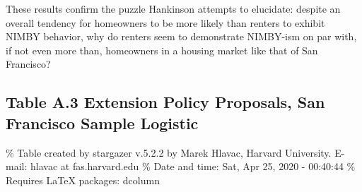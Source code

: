 \documentclass[]{article}
\begin{document}
These results confirm the puzzle Hankinson attempts to elucidate: despite an overall tendency for homeowners to be more likely than renters to exhibit NIMBY behavior, why do renters seem to demonstrate NIMBY-ism on par with, if not even more than, homeowners in a housing market like that of San Francisco?

\hypertarget{table-a.3-extension-policy-proposals-san-francisco-sample-logistic}{%
\subsection{Table A.3 Extension Policy Proposals, San Francisco Sample Logistic}\label{table-a.3-extension-policy-proposals-san-francisco-sample-logistic}}

\% Table created by stargazer v.5.2.2 by Marek Hlavac, Harvard University. E-mail: hlavac at fas.harvard.edu
\% Date and time: Sat, Apr 25, 2020 - 00:40:44
\% Requires LaTeX packages: dcolumn
\end{document}
